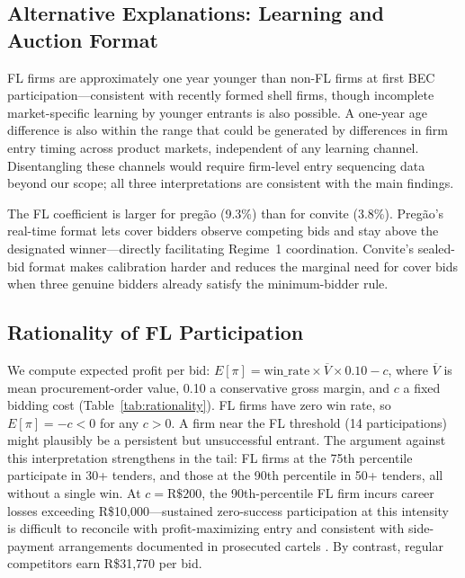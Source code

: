 \subsection{Alternative Explanations: Learning and Auction Format}

FL firms are approximately one year younger than non-FL firms at first
BEC participation---consistent with recently formed shell firms, though
incomplete market-specific learning by younger entrants is also
possible. A one-year age difference is also within the range that could
be generated by differences in firm entry timing across product markets,
independent of any learning channel. Disentangling these channels would
require firm-level entry sequencing data beyond our scope; all three
interpretations are consistent with the main findings.

The FL coefficient is larger for preg\~ao (9.3\%) than for convite
(3.8\%). Preg\~ao's real-time format lets cover bidders observe
competing bids and stay above the designated winner---directly
facilitating Regime~1 coordination. Convite's sealed-bid format makes
calibration harder and reduces the marginal need for cover bids when
three genuine bidders already satisfy the minimum-bidder rule.


\subsection{Rationality of FL Participation}
\label{sec:rationality}

We compute expected profit per bid: $E[\pi] = \text{win\_rate} \times
\overline{V} \times 0.10 - c$, where $\overline{V}$ is mean
procurement-order value, 0.10 a conservative gross margin, and $c$ a
fixed bidding cost (Table~\ref{tab:rationality}). FL firms have zero
win rate, so $E[\pi] = -c < 0$ for any $c > 0$. A firm near the FL
threshold (14 participations) might plausibly be a persistent but
unsuccessful entrant. The argument against this interpretation
strengthens in the tail: FL firms at the 75th percentile participate
in 30+ tenders, and those at the 90th percentile in 50+ tenders, all
without a single win. At $c = \text{R\$200}$, the 90th-percentile FL
firm incurs career losses exceeding R\$10,000---sustained
zero-success participation at this intensity is difficult to
reconcile with profit-maximizing entry and consistent with
side-payment arrangements documented in prosecuted cartels
\citep{asker2010leniency, marshall2012economics}. By contrast,
regular competitors earn R\$31,770 per bid.




